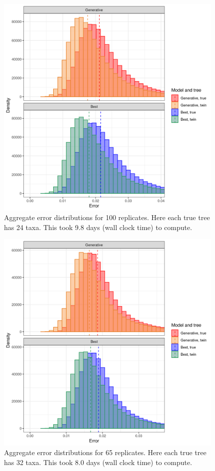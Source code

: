 \begin{figure}[H]
  \includegraphics[width=0.98\textwidth]{pirouette_example_33/errors.png}
  \caption{Aggregate error distributions for 100 replicates. Here each true tree has 24 taxa. This took 9.8 days (wall clock time) to compute.}
  \label{fig:example_24_taxa}
\end{figure}

\begin{figure}[H]
  \includegraphics[width=0.98\textwidth]{pirouette_example_41/errors.png}
  \caption{Aggregate error distributions for 65 replicates. Here each true tree has 32 taxa. This took 8.0 days (wall clock time) to compute.}
  \label{fig:example_32_taxa}
\end{figure}

